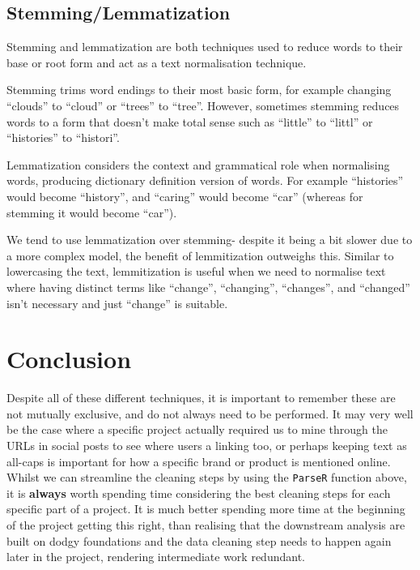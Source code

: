 \documentclass[
  letterpaper,
  DIV=11,
  numbers=noendperiod]{scrreprt}
\begin{document}
\subsection{Stemming/Lemmatization}\label{stemminglemmatization}

Stemming and lemmatization are both techniques used to reduce words to
their base or root form and act as a text normalisation technique.

Stemming trims word endings to their most basic form, for example
changing ``clouds'' to ``cloud'' or ``trees'' to ``tree''. However,
sometimes stemming reduces words to a form that doesn't make total sense
such as ``little'' to ``littl'' or ``histories'' to ``histori''.

Lemmatization considers the context and grammatical role when
normalising words, producing dictionary definition version of words. For
example ``histories'' would become ``history'', and ``caring'' would
become ``car'' (whereas for stemming it would become ``car'').

We tend to use lemmatization over stemming- despite it being a bit
slower due to a more complex model, the benefit of lemmitization
outweighs this. Similar to lowercasing the text, lemmitization is useful
when we need to normalise text where having distinct terms like
``change'', ``changing'', ``changes'', and ``changed'' isn't necessary
and just ``change'' is suitable.

\section{Conclusion}\label{conclusion}

Despite all of these different techniques, it is important to remember
these are not mutually exclusive, and do not always need to be
performed. It may very well be the case where a specific project
actually required us to mine through the URLs in social posts to see
where users a linking too, or perhaps keeping text as all-caps is
important for how a specific brand or product is mentioned online.
Whilst we can streamline the cleaning steps by using the \texttt{ParseR}
function above, it is \textbf{always} worth spending time considering
the best cleaning steps for each specific part of a project. It is much
better spending more time at the beginning of the project getting this
right, than realising that the downstream analysis are built on dodgy
foundations and the data cleaning step needs to happen again later in
the project, rendering intermediate work redundant.
\end{document}
